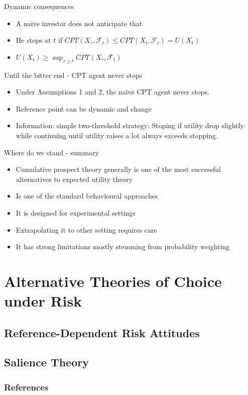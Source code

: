 \begin{frame}{Dynamic consequences}
    \begin{itemize}
        \item A naive investor does not anticipate that\medskip
        \item He stops at $t$ if $CPT(X_\tau,\mathcal{F}_t) \leq CPT(X_t,\mathcal{F}_t)=U(X_t)$\medskip
        \item $U(X_t) \geq \sup_{\tau \geq t} CPT(X_\tau,\mathcal{F}_t)$
    \end{itemize}
\end{frame}

\begin{frame}{Until the bitter end - CPT agent never stops}
    \begin{theorem}
        \begin{itemize}
        \item Under Assumptions 1 and 2, the naive CPT agent never stops.\medskip
        \item Reference point can be dynamic and change\medskip
        \item Information: simple two-threshold strategy:
        Stoping if utility drop slightly while continuing until utility raises a lot always exceeds stopping.\medskip
	\end{itemize}
\end{theorem}
\end{frame}

\begin{frame}{Where do we stand - summary}
    \begin{itemize}
        \item Cumulative prospect theory generally is one of the most successful alternatives to expected utility theory\medskip
        \item Is one of the standard behavioural approaches\medskip
        \item It is designed for experimental settings\medskip
        \item Extrapolating it to other setting requires care\medskip
        \item It has strong limitations mostly stemming from probability weighting\medskip
    \end{itemize}
\end{frame}




\section{Alternative Theories of Choice under Risk}
\subsection{Reference-Dependent Risk Attitudes}
\subsection{Salience Theory}

\begin{frame}[allowframebreaks]
    \frametitle{References}
    \renewcommand{\bibfont}{\normalfont\footnotesize}
    \printbibliography
\end{frame}


